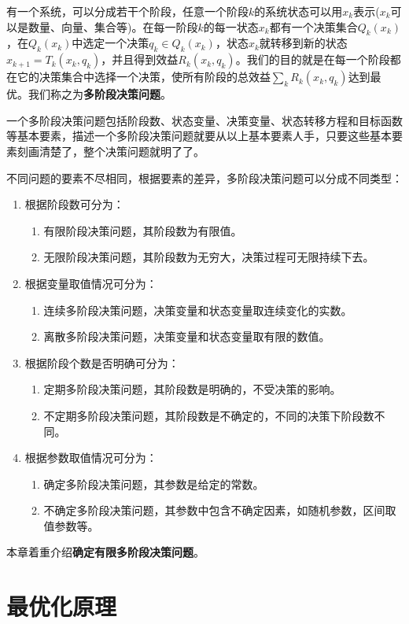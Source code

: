 \documentclass[lang = cn, scheme = chinese, thmcnt = section]{elegantbook}
\begin{document}
有一个系统，可以分成若干个阶段，任意一个阶段$k$的系统状态可以用$x_k$表示($x_k$可以是数量、向量、集合等)。在每一阶段$k$的每一状态$x_k$都有一个决策集合$Q_k(x_k)$，在$Q_k(x_k)$中选定一个决策$q_k\in Q_k(x_k)$，状态$x_k$就转移到新的状态$x_{k+1}=T_k(x_k,q_k)$，并且得到效益$R_k(x_k,q_k)$。我们的目的就是在每一个阶段都在它的决策集合中选择一个决策，使所有阶段的总效益$\sum_kR_k(x_k,q_k)$达到最优。我们称之为\textbf{多阶段决策问题}。

一个多阶段决策问题包括阶段数、状态变量、决策变量、状态转移方程和目标函数等基本要素，描述一个多阶段决策问题就要从以上基本要素人手，只要这些基本要素刻画清楚了，整个决策问题就明了了。

不同问题的要素不尽相同，根据要素的差异，多阶段决策问题可以分成不同类型：
\begin{enumerate}
	\item 根据阶段数可分为：
	\begin{enumerate}
		\item 有限阶段决策问题，其阶段数为有限值。
		\item 无限阶段决策问题，其阶段数为无穷大，决策过程可无限持续下去。
	\end{enumerate}
	\item 根据变量取值情况可分为：
	\begin{enumerate}
		\item 连续多阶段决策问题，决策变量和状态变量取连续变化的实数。
		\item 离散多阶段决策问题，决策变量和状态变量取有限的数值。
	\end{enumerate}
	\item 根据阶段个数是否明确可分为：
	\begin{enumerate}
		\item 定期多阶段决策问题，其阶段数是明确的，不受决策的影响。
		\item 不定期多阶段决策问题，其阶段数是不确定的，不同的决策下阶段数不同。
	\end{enumerate}
	\item 根据参数取值情况可分为：
	\begin{enumerate}
		\item 确定多阶段决策问题，其参数是给定的常数。
		\item 不确定多阶段决策问题，其参数中包含不确定因素，如随机参数，区间取值参数等。
	\end{enumerate}
\end{enumerate}

本章着重介绍\textbf{确定有限多阶段决策问题}。

\section{最优化原理}
\end{document}
